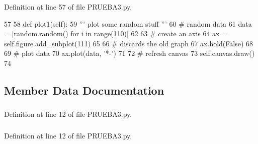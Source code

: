 \-Definition at line 57 of file \-P\-R\-U\-E\-B\-A3.\-py.


\begin{DoxyCode}
57 
58     def plot1(self):
59         ''' plot some random stuff '''
60         # random data
61         data = [random.random() for i in range(110)]
62 
63         # create an axis
64         ax = self.figure.add_subplot(111)
65 
66         # discards the old graph
67         ax.hold(False)
68 
69         # plot data
70         ax.plot(data, '*-')
71 
72         # refresh canvas
73         self.canvas.draw()
74         

\end{DoxyCode}


\subsection{\-Member \-Data \-Documentation}
\subsubsection[{button}]{}\label{classpruebas_1_1_p_r_u_e_b_a3_1_1_window_aad647ea148e13c1103c8acc34800df7b}


\-Definition at line 12 of file \-P\-R\-U\-E\-B\-A3.\-py.

\subsubsection[{button1}]{}\label{classpruebas_1_1_p_r_u_e_b_a3_1_1_window_ab04c681d93c594fc13e6a83437d10170}


\-Definition at line 12 of file \-P\-R\-U\-E\-B\-A3.\-py.

\subsubsection[{canvas}]{}\label{classpruebas_1_1_p_r_u_e_b_a3_1_1_window_a100dd13c20d29b2373b29c7788a2c2e3}


